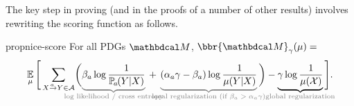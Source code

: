 %
The key step in proving 
(and in the proofs of a number of other results) involves 
rewriting  
the scoring function 
as follows.

\begin{linked}{prop}{nice-score}%
    \def\xinw{X}
    \def\yinw{Y}
For all PDGs $\dg M$, 
$\bbr{\dg M}_\gamma(\mu) = $
\begin{equation}\label{eq:semantics-breakdown}
    \Ex_{\mu}
    \Bigg[
     \sum_{ \ed aXY \in \Ar }
     \!
    \bigg(
        {\color{gray}
        \underbrace{\color{black}
          \beta_a \log \frac{1}{\p_a(\yinw | \xinw)}
    	}_{\color{gray}\smash{\mathclap{\text{log likelihood / cross entropy}}}}} \,+\,
        {\color{gray}\underbrace{\color{black} 
    ({\alpha_a}\gamma - \beta_a ) \log \frac{1}{\mu(\yinw |\xinw)} 
    	}_{\color{gray}\smash{\mathclap{\text{local regularization (if $\beta_a > 
    	\alpha_a
    	\gamma$)}}}}}\,\bigg) - \underbrace{\color{black}
    \gamma \log \frac{1}{\mu(\X)}
    	}_{\color{gray}\smash{\mathclap{\text{global
            regularization}}}}\color{black} \Bigg].
\end{equation}
\end{linked}
